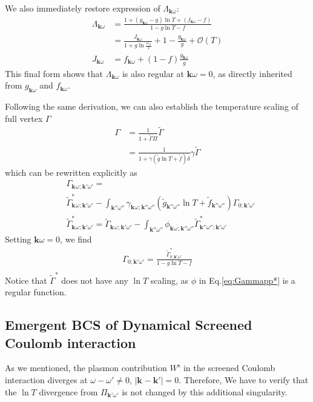 \documentclass[%
 reprint,
superscriptaddress,
 amsmath,amssymb,
 aps,
prx,
]{revtex4-2}
\newcommand{\bk}{\mathbf{k}}
\newcommand{\Gammapp}{\tilde{\Gamma}}
\newcommand{\txs}{\text{s}}
\newcommand{\pcf}{\Lambda} %
\begin{document}
\begin{appendices}
We also immediately restore expression of $\pcf_{\bk\omega}$:
\begin{align}
\label{eq:RK_final}
\pcf_{\bk\omega}&= \frac{1+(g_{\bk\omega} - g)\ln T +(f_{\bk\omega} -f)}{1 - g\ln {T} - f}\nonumber\\
	&= \frac{J_{\bk\omega}}{1+g \ln \frac{\omega_\Lambda}{T}} + 1 - \frac{g_{\bk\omega}}{g} + \mathcal O(T)\\
J_{\bk\omega} &= f_{\bk\omega} +(1-f)\frac{g_{\bk\omega}}{g}
\end{align}
This final form shows that $\pcf_{\bk\omega}$ is also regular at $\bk\omega=0$, as directly inherited from $g_{\bk\omega}$ and $f_{\bk\omega}$.

Following the same derivation, we can also establish the temperature scaling of full vertex $\Gamma$
\begin{align}
    \Gamma& = \frac{1}{1+\Gammapp \Pi}\Gammapp \nonumber\\
    &= \frac{1}{1+ \gamma (\tilde{g}\ln{T}+\tilde{f})\delta} \gamma \Gammapp
\end{align}
which can be rewritten explicitly as
\begin{align}
	&\Gamma_{\bk^{}\omega^{};\bk'\omega'}=\nonumber\\
 &\Gammapp^{*}_{\bk^{}\omega^{};\bk'\omega'}-\int_{\bk''\omega''} \gamma_{\bk^{}\omega^{};\bk''\omega''}\left(\tilde{g}_{\bk''\omega''}\ln {T}+ \tilde{f}_{\bk''\omega''}\right) \Gamma_{0;\bk'\omega'}  \nonumber\\
 &\Gammapp^{*}_{\bk^{}\omega^{};\bk'\omega'} = \Gammapp_{\bk^{}\omega^{};\bk'\omega'} - \int_{\bk''\omega''} \phi_{\bk^{}\omega^{};\bk''\omega''} \Gammapp^{*}_{\bk''\omega'';\bk'\omega'}
 \label{eq:Gammapp*}
\end{align}
Setting $\bk\omega = 0$, we find
\begin{align}
\label{eq:fullGamma_scaling}
	\Gamma_{0;\bk'\omega'}=\frac{\Gammapp^{*}_{0;\bk'\omega'}}{1 - g\ln {T} - f}\nonumber\\
\end{align}
Notice that $\Gammapp^*$ does not have any $\ln T$ scaling, as $\phi$ in Eq.\eqref{eq:Gammapp*} is a regular function. 


\subsection{Emergent BCS of Dynamical Screened Coulomb interaction}
\label{sec:app_eliashberg}
As we mentioned, the plasmon contribution $W^\txs$ in the screened Coulomb interaction diverges at $\omega-\omega' \neq 0$,  $|\bk^{}-\bk'|=0$. Therefore,
We have to verify that the $\ln T$ divergence from $\Pi_{\bk'\omega'}$ is not changed by this additional singularity. 



\end{appendices}
\end{document}
